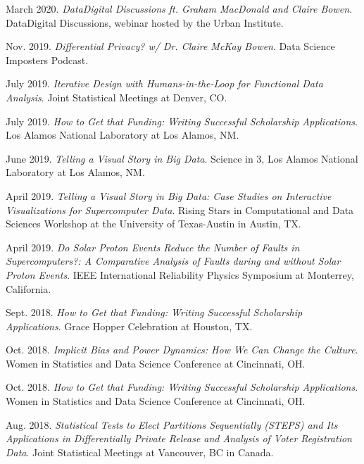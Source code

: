 \documentclass[11pt, letterpaper, roman]{moderncv} %
\begin{document}
\begin{etaremune}[topsep=0pt, itemsep=6pt, partopsep=0pt, parsep=0pt]
  \item March 2020. \textit{Data\@Urban Digital Discussions ft. Graham MacDonald and Claire Bowen}. Data\@Urban Digital Discussions, webinar hosted by the Urban Institute.
  
  \item Nov. 2019. \textit{Differential Privacy? w/ Dr. Claire McKay Bowen}. Data Science Imposters Podcast.
  
  \item July 2019. \textit{Iterative Design with Humans-in-the-Loop for Functional Data Analysis}. Joint Statistical Meetings at Denver, CO. 

  \item July 2019. \textit{How to Get that Funding: Writing Successful Scholarship Applications}. Los Alamos National Laboratory at Los Alamos, NM.

  \item June 2019. \textit{Telling a Visual Story in Big Data}. Science in 3, Los Alamos National Laboratory at Los Alamos, NM. 
  
  \item April 2019. \textit{Telling a Visual Story in Big Data: Case Studies on Interactive Visualizations for Supercomputer Data}. Rising Stars in Computational and Data Sciences Workshop at the University of Texas-Austin in Austin, TX.

  \item April 2019. \textit{Do Solar Proton Events Reduce the Number of Faults in Supercomputers?: A Comparative Analysis of Faults during and without Solar Proton Events}. IEEE International Reliability Physics Symposium at Monterrey, California.
  
  \item Sept. 2018. \textit{How to Get that Funding: Writing Successful Scholarship Applications}. Grace Hopper Celebration at Houston, TX.
  
  \item Oct. 2018. \textit{Implicit Bias and Power Dynamics: How We Can Change the Culture}. Women in Statistics and Data Science Conference at Cincinnati, OH.

  \item Oct. 2018. \textit{How to Get that Funding: Writing Successful Scholarship Applications}. Women in Statistics and Data Science Conference at Cincinnati, OH.

  \item Aug. 2018. \textit{Statistical Tests to Elect Partitions Sequentially (STEPS) and Its Applications in Differentially Private Release and Analysis of Voter Registration Data}. Joint Statistical Meetings at Vancouver, BC in Canada.
  

\end{etaremune}
\end{document}
